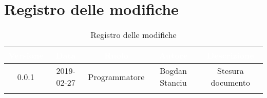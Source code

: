 \newpage

\section{Registro delle modifiche}

\begin{center}
\begin{longtable}{|c|c|c|c|c|}
\hline
\rowcolor{bluelogo}\textbf{\textcolor{white}{Versione}} & \textbf{\textcolor{white}{Data}} & \textbf{\textcolor{white}{Ruolo}} & \textbf{\textcolor{white}{Autore}} & \textbf{\textcolor{white}{Descrizione}}\\
\hline 
\endfirsthead
\rowcolor{grigio} 0.0.1 & 2019-02-27 & Programmatore & Bogdan Stanciu & Stesura documento \\
\hline
\caption{Registro delle modifiche}
\end{longtable}
\end{center}
